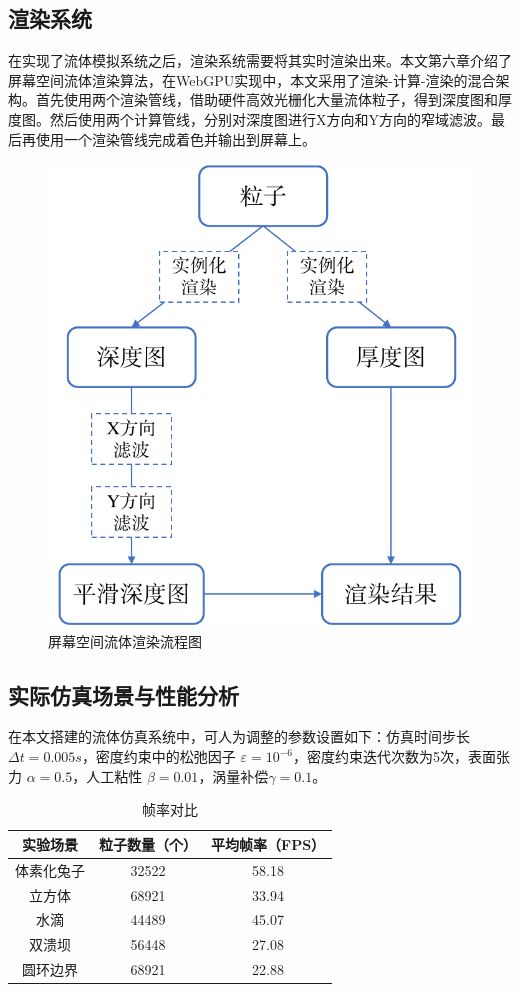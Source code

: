 \subsection{渲染系统}
    在实现了流体模拟系统之后，渲染系统需要将其实时渲染出来。本文第六章介绍了屏幕空间流体渲染算法，在WebGPU实现中，本文采用了渲染-计算-渲染的混合架构。首先使用两个渲染管线，借助硬件高效光栅化大量流体粒子，得到深度图和厚度图。然后使用两个计算管线，分别对深度图进行X方向和Y方向的窄域滤波。最后再使用一个渲染管线完成着色并输出到屏幕上。

    \begin{figure}
    	\centering
    	\includegraphics[width=.45\textwidth]{figures/webgpu/pipeline.pdf}
    	\caption{屏幕空间流体渲染流程图}
    \end{figure}

\subsection{实际仿真场景与性能分析}
    在本文搭建的流体仿真系统中，可人为调整的参数设置如下：仿真时间步长 $\Delta t = 0.005s$，密度约束中的松弛因子 $\varepsilon = 10^{-6}$，密度约束迭代次数为5次，表面张力 $\alpha = 0.5$，人工粘性 $\beta=0.01$，涡量补偿$\gamma = 0.1$。

    \begin{table}
    	\centering
    	\caption{帧率对比}
    	\begin{tabular}{ccc}
    	\toprule
    	实验场景 & 粒子数量（个） & 平均帧率（FPS） \\
    	\midrule
    	体素化兔子 & 32522	& 58.18	\\
    	立方体 & 68921	& 33.94	\\
    	水滴	 & 44489 & 45.07	\\
    	双溃坝 & 56448	& 27.08	\\
    	圆环边界 & 68921	& 22.88	\\
    	\bottomrule
    	\end{tabular}
    \end{table}
    
